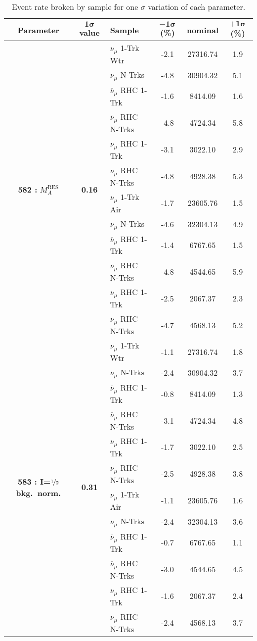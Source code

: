 \begin{table}[ht!]
\centering
\begin{tabular}{ c  c  l  c  c  c }
\midrule[1.3pt]
\textbf{Parameter} & \textbf{$\mathbf{1\sigma}$ value} & \textbf{Sample} & \textbf{$\mathbf{-1\sigma}$ (\%)}  &  \textbf{nominal}  &  \textbf{$\mathbf{+1\sigma}$ (\%)} \\
\midrule[1.3pt]
\multirow{12}{*}{\textbf{582 : }$M_A^\text{RES}$} & \multirow{12}{*}{\textbf{0.16}} & $\nu_\mu$ 1-Trk Wtr &   -2.1 &  27316.74 &   1.9 \\ 
 &  & $\nu_\mu$ N-Trks &   -4.8 &  30904.32 &   5.1 \\ 
 &  & $\overline{\nu}_\mu$ RHC 1-Trk &   -1.6 &  8414.09 &   1.6 \\ 
 &  & $\overline{\nu}_\mu$ RHC N-Trks &   -4.8 &  4724.34 &   5.8 \\ 
 &  & $\nu_\mu$ RHC 1-Trk &   -3.1 &  3022.10 &   2.9 \\ 
 &  & $\nu_\mu$ RHC N-Trks &   -4.8 &  4928.38 &   5.3 \\ 
 &  & $\nu_\mu$ 1-Trk Air &   -1.7 &  23605.76 &   1.5 \\ 
 &  & $\nu_\mu$ N-Trks &   -4.6 &  32304.13 &   4.9 \\ 
 &  & $\overline{\nu}_\mu$ RHC 1-Trk &   -1.4 &  6767.65 &   1.5 \\ 
 &  & $\overline{\nu}_\mu$ RHC N-Trks &   -4.8 &  4544.65 &   5.9 \\ 
 &  & $\nu_\mu$ RHC 1-Trk &   -2.5 &  2067.37 &   2.3 \\ 
 &  & $\nu_\mu$ RHC N-Trks &   -4.7 &  4568.13 &   5.2 \\ 
\midrule[1.3pt]
\multirow{12}{*}{\textbf{583 : I=}$\nicefrac{1}{2}$ \textbf{bkg.\ norm.}} & \multirow{12}{*}{\textbf{0.31}} & $\nu_\mu$ 1-Trk Wtr &   -1.1 &  27316.74 &   1.8 \\ 
 &  & $\nu_\mu$ N-Trks &   -2.4 &  30904.32 &   3.7 \\ 
 &  & $\overline{\nu}_\mu$ RHC 1-Trk &   -0.8 &  8414.09 &   1.3 \\ 
 &  & $\overline{\nu}_\mu$ RHC N-Trks &   -3.1 &  4724.34 &   4.8 \\ 
 &  & $\nu_\mu$ RHC 1-Trk &   -1.7 &  3022.10 &   2.5 \\ 
 &  & $\nu_\mu$ RHC N-Trks &   -2.5 &  4928.38 &   3.8 \\ 
 &  & $\nu_\mu$ 1-Trk Air &   -1.1 &  23605.76 &   1.6 \\ 
 &  & $\nu_\mu$ N-Trks &   -2.4 &  32304.13 &   3.6 \\ 
 &  & $\overline{\nu}_\mu$ RHC 1-Trk &   -0.7 &  6767.65 &   1.1 \\ 
 &  & $\overline{\nu}_\mu$ RHC N-Trks &   -3.0 &  4544.65 &   4.5 \\ 
 &  & $\nu_\mu$ RHC 1-Trk &   -1.6 &  2067.37 &   2.4 \\ 
 &  & $\nu_\mu$ RHC N-Trks &   -2.4 &  4568.13 &   3.7 \\ 
\midrule[1.3pt]
\end{tabular}
\centering
\caption{Event rate broken by sample for one $\sigma$ variation of each parameter.}
\end{table}
\addtocounter{table}{-1}
 
